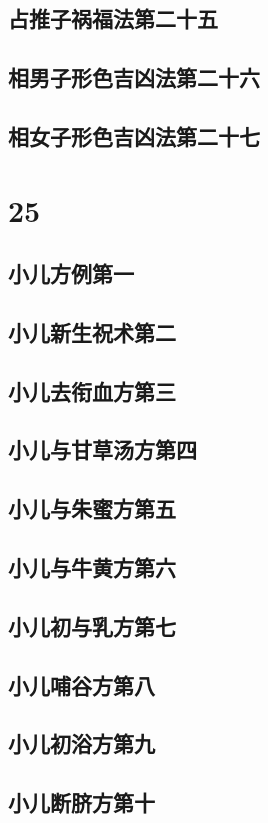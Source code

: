 \documentclass[a4paper,12pt,UTF8,twoside]{ctexbook}
\begin{document}
\chapter{占推子祸福法第二十五}
\chapter{相男子形色吉凶法第二十六}
\chapter{相女子形色吉凶法第二十七}

\part{25}
\chapter{小儿方例第一}
\chapter{小儿新生祝术第二}
\chapter{小儿去衔血方第三}
\chapter{小儿与甘草汤方第四}
\chapter{小儿与朱蜜方第五}
\chapter{小儿与牛黄方第六}
\chapter{小儿初与乳方第七}
\chapter{小儿哺谷方第八}
\chapter{小儿初浴方第九}
\chapter{小儿断脐方第十}
\end{document}
